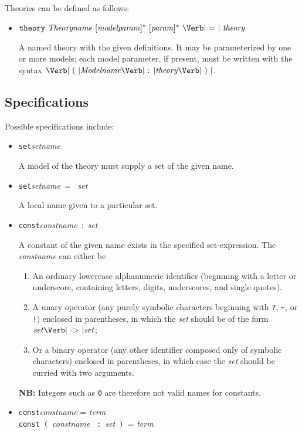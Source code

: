 \documentclass{article}
\newcommand{\keywd}[1]{\mbox{\texttt{#1}}\xspace}
\newcommand{\CONST}{\keywd{const}}
\newcommand{\SET}{\keywd{set}}
\newcommand{\THEORY}{\keywd{theory}}
\newcommand{\metav}[1]{\mbox{\textit{#1}}\xspace}
\newcommand{\MIdentifier}{\metav{Modelname}}
\newcommand{\Setexp}{\metav{set}}
\newcommand{\Param}{\metav{param}}
\newcommand{\MParam}{\metav{modelparam}}
\newcommand{\Term}{\metav{term}}
\newcommand{\Theoryexp}{\metav{theory}}
\newcommand{\COLON}{\mbox{\Verb| : |}}
\newcommand{\EQUALS}{\mbox{\Verb| = |}}
\newcommand{\LPAREN}{\mbox{\Verb| ( |}}
\newcommand{\RPAREN}{\mbox{\Verb| ) |}}
\newcommand{\TO}{\mbox{\Verb| -> |}}
\newcommand{\NB}{\textbf{NB: }}
\begin{document}
\noindent Theories can be defined as follows:
\begin{itemize}
\item $\THEORY\ \metav{Theoryname}\ [\MParam]^*\ [\Param]^*\ \EQUALS\ \Theoryexp$

   A named theory with the given definitions.  It may be parameterized
   by one or more models; each model parameter, if present, must be written
   with the syntax $\LPAREN \MIdentifier \COLON \Theoryexp \RPAREN$.
\end{itemize}



\subsection{Specifications}
Possible
specifications include:
\begin{itemize}
\item \SET \metav{setname}

A model of the theory must supply a set of the given name.

\item \SET \metav{setname}\ = \ \Setexp

A local name given to a particular set.

\item \CONST \metav{constname}\ :\ \Setexp

A constant of the given name exists in the specified set-expression.
The \metav{constname} can either be
\begin{enumerate}
\item An ordinary lowercase alphanumeric identifier (beginning with a
  letter or underscore, containing letters, digits, underscores, and
  single quotes).
\item A unary operator (any purely symbolic characters beginning with \Verb|?|, \Verb|~|, or \Verb|!|) enclosed in parentheses, in which the \Setexp should be of the form $\Setexp \TO \Setexp$;
\item Or a binary operator (any other identifier composed only of
  symbolic characters) enclosed in parentheses, in which case the
  \Setexp should be curried with two arguments.
\end{enumerate}

\NB Integers such as \Verb|0| are therefore not valid names for constants.

\item \CONST \metav{constname} = \Term\\
      \CONST \LPAREN \metav{constname} \COLON \Setexp \RPAREN = \Term\\
      

\end{itemize}
\end{document}
